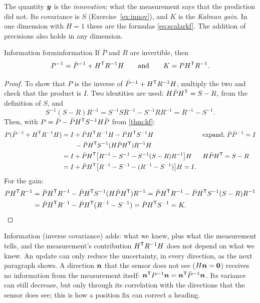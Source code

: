 The quantity $\bm{y}$ is the \emph{innovation}: what the measurement says that
the prediction did not. Its covariance is $S$ (Exercise~\ref{ex:innov}),
and $K$ is the \emph{Kalman gain}. In one dimension with $H=1$ these are
the formulas \eqref{eq:scalarkf}. The addition of precisions also holds in
any dimension.


\begin{proposition}{Information form}{information}
If $\bar P$ and $R$ are invertible, then
\[
  P^{-1}=\bar P^{-1}+H^{\mathsf{T}} R^{-1}H\qquad\text{and}\qquad K=PH^{\mathsf{T}} R^{-1}.
\]
\end{proposition}

\begin{proof}
To show that $P$ is the inverse of $\bar P^{-1}+H^{\mathsf{T}} R^{-1}H$, multiply the
two and check that the product is $I$. Two identities are used:
$H\bar PH^{\mathsf{T}}=S-R$, from the definition of $S$, and
\[
  S^{-1}(S-R)R^{-1}=S^{-1}SR^{-1}-S^{-1}RR^{-1}=R^{-1}-S^{-1} .
\]
Then, with $P=\bar P-\bar PH^{\mathsf{T}} S^{-1}H\bar P$ from \cref{thm:kf}:
\begin{align*}
  P(\bar P^{-1}+H^{\mathsf{T}} R^{-1}H)
  &=I+\bar PH^{\mathsf{T}} R^{-1}H-\bar PH^{\mathsf{T}} S^{-1}H
  &&\text{expand; }\bar P\bar P^{-1}=I\\
  &\qquad-\bar PH^{\mathsf{T}} S^{-1}(H\bar PH^{\mathsf{T}})R^{-1}H\\
  &=I+\bar PH^{\mathsf{T}}\bigl[R^{-1}-S^{-1}-S^{-1}(S-R)R^{-1}\bigr]H
  &&H\bar PH^{\mathsf{T}}=S-R\\
  &=I+\bar PH^{\mathsf{T}}\bigl[R^{-1}-S^{-1}-(R^{-1}-S^{-1})\bigr]H=I .
\end{align*}
For the gain:
\begin{align*}
  PH^{\mathsf{T}} R^{-1}
  &=\bar PH^{\mathsf{T}} R^{-1}-\bar PH^{\mathsf{T}} S^{-1}(H\bar PH^{\mathsf{T}})R^{-1}
   =\bar PH^{\mathsf{T}} R^{-1}-\bar PH^{\mathsf{T}} S^{-1}(S-R)R^{-1}\\
  &=\bar PH^{\mathsf{T}} R^{-1}-\bar PH^{\mathsf{T}}(R^{-1}-S^{-1})=\bar PH^{\mathsf{T}} S^{-1}=K .
\end{align*}
\end{proof}

\begin{inwords}
Information (inverse covariance) adds: what we knew, plus what the
measurement tells, and the measurement's contribution $H^{\mathsf{T}} R^{-1}H$ does
not depend on what we knew. An update can only reduce the uncertainty, in every direction, as the
next paragraph shows. A direction $\bm{n}$ that the sensor
does not see ($H\bm{n}=\bm{0}$) receives no information from the
measurement itself: $\bm{n}^{\mathsf{T}} P^{-1}\bm{n}=\bm{n}^{\mathsf{T}}\bar P^{-1}\bm{n}$.
Its variance can still decrease, but only through its correlation with the
directions that the sensor does see; this is how a position fix can
correct a heading.
\end{inwords}

